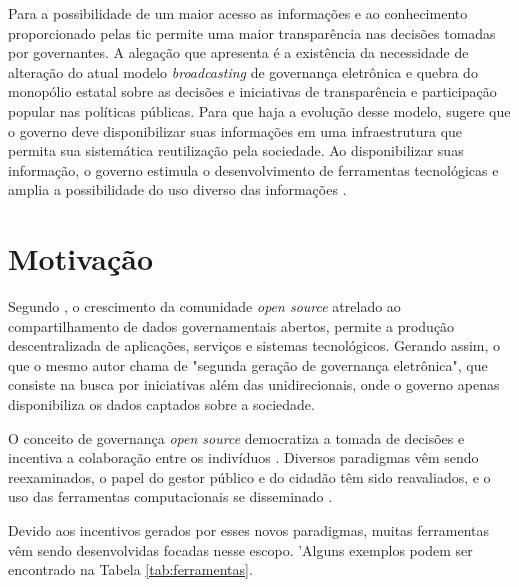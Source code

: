 \vspace{0.3CM}
\par
Para \cite{braga2016participaccao} a possibilidade de um maior acesso as informações e ao conhecimento proporcionado pelas \acrshort{tic}
permite uma maior transparência nas decisões tomadas por governantes. A alegação que \cite{vaz2017transformaccoes} apresenta é a existência da necessidade de alteração do atual modelo
\textit{broadcasting} de governança eletrônica e quebra do monopólio estatal sobre as decisões e iniciativas de transparência e participação popular nas políticas públicas.
Para que haja a evolução desse modelo, \cite{o2011government} sugere que o governo deve disponibilizar suas informações em uma infraestrutura que permita sua sistemática reutilização
pela sociedade. Ao disponibilizar suas informação, o governo estimula o desenvolvimento de ferramentas tecnológicas e amplia a possibilidade 
do uso diverso das informações \cite{zuiderwijk2012socio}.

\section{Motivação}
\label{sec:motivacao}
Segundo \cite{vaz2017transformaccoes}, o crescimento da comunidade \textit{open source} atrelado ao compartilhamento de dados governamentais abertos, permite a produção
descentralizada de aplicações, serviços e sistemas tecnológicos. Gerando assim, o que o mesmo autor chama de "segunda geração de governança eletrônica", que consiste na busca
por iniciativas além das unidirecionais, onde o governo apenas disponibiliza os dados captados sobre a sociedade.

\par
O conceito de governança \textit{open source} democratiza a tomada de decisões e incentiva a colaboração entre os indivíduos \cite{rushkoff2003open}.
Diversos paradigmas vêm sendo reexaminados, o papel do gestor público e do cidadão têm sido reavaliados,
e o uso das ferramentas computacionais se disseminado \cite{medeiros2009novos}.

\par
Devido aos incentivos gerados por esses novos paradigmas, muitas ferramentas vêm sendo desenvolvidas focadas nesse escopo.
'Alguns exemplos podem ser encontrado na Tabela \ref{tab:ferramentas}.

